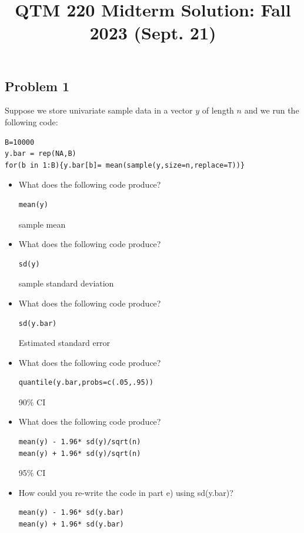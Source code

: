 \documentclass[10pt]{article}
\title{QTM 220 Midterm Solution: Fall 2023 (Sept. 21)}
\date{}
\begin{document}
\maketitle


\subsection*{Problem 1}

Suppose we store univariate sample data in a vector $y$ of length $n$ and we run the following code:

\begin{verbatim}
B=10000
y.bar = rep(NA,B)
for(b in 1:B){y.bar[b]= mean(sample(y,size=n,replace=T))}
\end{verbatim}


\begin{itemize}
\item[a)]  What does the following code produce?

\begin{verbatim}
mean(y)
\end{verbatim}

\color{red} sample mean \color{black}

\item[b)] What does the following code produce?
\begin{verbatim}
sd(y)
\end{verbatim}

\color{red} sample standard deviation \color{black}


\item[c)]  What does the following code produce?

\begin{verbatim}
sd(y.bar)
\end{verbatim}

\color{red} Estimated standard error \color{black}

\item[d)] What does the following code produce?
\begin{verbatim}
quantile(y.bar,probs=c(.05,.95)) 
\end{verbatim}

\color{red} 90\% CI \color{black}

\item[e)] What does the following code produce?
\begin{verbatim}
mean(y) - 1.96* sd(y)/sqrt(n)
mean(y) + 1.96* sd(y)/sqrt(n)
\end{verbatim}

\color{red} 95\% CI \color{black}

\item[f)] How could you re-write the code in part e) using sd(y.bar)?

\color{red} \begin{verbatim}
mean(y) - 1.96* sd(y.bar)
mean(y) + 1.96* sd(y.bar)
\end{verbatim}
 \color{black}



\end{itemize}
\end{document}
